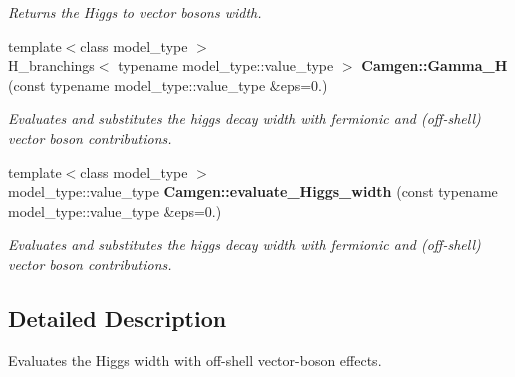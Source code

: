 \begin{DoxyCompactItemize}
\begin{DoxyCompactList}\small\item\em Returns the Higgs to vector bosons width. \end{DoxyCompactList}\item 
{\footnotesize template$<$class model\+\_\+type $>$ }\\H\+\_\+branchings$<$ typename model\+\_\+type\+::value\+\_\+type $>$ {\bfseries Camgen\+::\+Gamma\+\_\+\+H} (const typename model\+\_\+type\+::value\+\_\+type \&eps=0.)
\begin{DoxyCompactList}\small\item\em Evaluates and substitutes the higgs decay width with fermionic and (off-\/shell) vector boson contributions. \end{DoxyCompactList}\item 
{\footnotesize template$<$class model\+\_\+type $>$ }\\model\+\_\+type\+::value\+\_\+type {\bfseries Camgen\+::evaluate\+\_\+\+Higgs\+\_\+width} (const typename model\+\_\+type\+::value\+\_\+type \&eps=0.)
\begin{DoxyCompactList}\small\item\em Evaluates and substitutes the higgs decay width with fermionic and (off-\/shell) vector boson contributions. \end{DoxyCompactList}\end{DoxyCompactItemize}


\subsection{Detailed Description}
Evaluates the Higgs width with off-\/shell vector-\/boson effects. 

